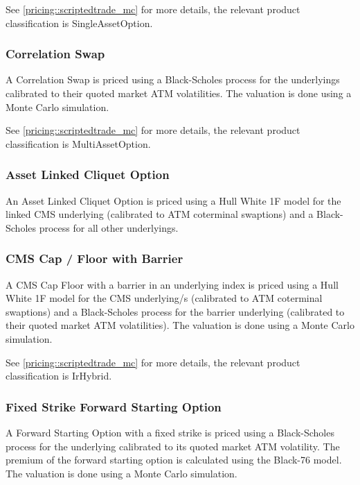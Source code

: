 See \ref{pricing::scriptedtrade_mc} for more details, the relevant product classification is SingleAssetOption.

\subsubsection{Correlation Swap}
\label{pricing::correlation_swap}

A Correlation Swap is priced using a Black-Scholes process for the underlyings calibrated to their quoted market
ATM volatilities. The valuation is done using a Monte Carlo simulation.

See \ref{pricing::scriptedtrade_mc} for more details, the relevant product classification is MultiAssetOption.

\subsubsection{Asset Linked Cliquet Option}
\label{pricing::asset_linked_cliquet_option}

An Asset Linked Cliquet Option is priced using a Hull White 1F model for the linked CMS
underlying (calibrated to ATM coterminal swaptions) and a Black-Scholes process for all
other underlyings.

\subsubsection{CMS Cap / Floor with Barrier}
\label{pricing::cms_capfloor_barrier}

A CMS Cap Floor with a barrier in an underlying index is priced using a Hull White 1F model for the CMS underlying/s
(calibrated to ATM coterminal swaptions) and a Black-Scholes process for the barrier underlying (calibrated to
their quoted market ATM volatilities). The valuation is done using a Monte Carlo simulation.

See \ref{pricing::scriptedtrade_mc} for more details, the relevant product classification is IrHybrid.

\subsubsection{Fixed Strike Forward Starting Option}
\label{pricing::fixed_strike_forward_starting_option}

A Forward Starting Option with a fixed strike is priced using a Black-Scholes process for the underlying
calibrated to its quoted market ATM volatility. The premium of the forward starting option is calculated
using the Black-76 model. The valuation is done using a Monte Carlo simulation.

